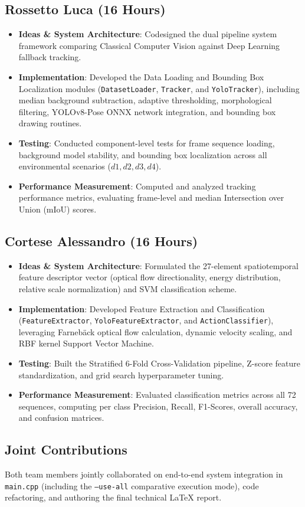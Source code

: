 \documentclass[11pt,a4paper]{article}
\begin{document}
\subsection{Rossetto Luca (16 Hours)}
\begin{itemize}
    \item \textbf{Ideas \& System Architecture}: Codesigned the dual pipeline system framework comparing Classical Computer Vision against Deep Learning fallback tracking.
    \item \textbf{Implementation}: Developed the Data Loading and Bounding Box Localization modules (\texttt{DatasetLoader}, \texttt{Tracker}, and \texttt{YoloTracker}), including median background subtraction, adaptive thresholding, morphological filtering, YOLOv8-Pose ONNX network integration, and bounding box drawing routines.
    \item \textbf{Testing}: Conducted component-level tests for frame sequence loading, background model stability, and bounding box localization across all environmental scenarios ($d1, d2, d3, d4$).
    \item \textbf{Performance Measurement}: Computed and analyzed tracking performance metrics, evaluating frame-level and median Intersection over Union (mIoU) scores.
\end{itemize}

\subsection{Cortese Alessandro (16 Hours)}
\begin{itemize}
    \item \textbf{Ideas \& System Architecture}: Formulated the 27-element spatiotemporal feature descriptor vector (optical flow directionality, energy distribution, relative scale normalization) and SVM classification scheme.
    \item \textbf{Implementation}: Developed Feature Extraction and Classification (\texttt{FeatureExtractor}, \texttt{YoloFeatureExtractor}, and \texttt{ActionClassifier}), leveraging Farneb\"ack optical flow calculation, dynamic velocity scaling, and RBF kernel Support Vector Machine.
    \item \textbf{Testing}: Built the Stratified 6-Fold Cross-Validation pipeline, Z-score feature standardization, and grid search hyperparameter tuning.
    \item \textbf{Performance Measurement}: Evaluated classification metrics across all 72 sequences, computing per class Precision, Recall, F1-Scores, overall accuracy, and confusion matrices.
\end{itemize}

\subsection{Joint Contributions}
Both team members jointly collaborated on end-to-end system integration in \texttt{main.cpp} (including the \texttt{--use-all} comparative execution mode), code refactoring, and authoring the final technical LaTeX report.
\end{document}
